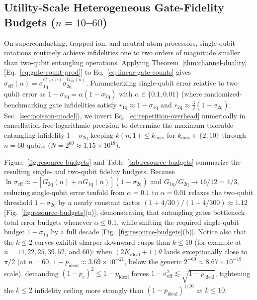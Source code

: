 \subsection{Utility-Scale Heterogeneous Gate-Fidelity Budgets (\texorpdfstring{$n = 10$--$60$}{n = 10--60})}
\label{sec:resource-budgets}

On superconducting, trapped-ion, and neutral-atom processors, single-qubit rotations routinely achieve infidelities one to two orders of magnitude smaller than two-qubit entangling operations. Applying Theorem~\ref{thm:channel-duality} [Eq.~\eqref{eq:gate-count-prod}] to Eq.~\eqref{eq:linear-gate-counts} gives $\sigma_{\mathrm{eff}}(n) = \sigma_{1\mathrm{q}}^{G_{1\mathrm{q}}(n)}\sigma_{2\mathrm{q}}^{G_{2\mathrm{q}}(n)}$. Parameterizing single-qubit error relative to two-qubit error as $1 - \sigma_{1\mathrm{q}} = \alpha(1 - \sigma_{2\mathrm{q}})$ with $\alpha \in \{0.1, 0.01\}$ (where randomized-benchmarking gate infidelities satisfy $r_{1\mathrm{q}} \approx 1 - \sigma_{1\mathrm{q}}$ and $r_{2\mathrm{q}} \approx \tfrac{3}{2}(1 - \sigma_{2\mathrm{q}})$; Sec.~\ref{sec:poisson-model}), we invert Eq.~\eqref{eq:repetition-overhead} numerically in cancellation-free logarithmic precision to determine the maximum tolerable entangling infidelity $1 - \sigma_{2\mathrm{q}}$ keeping $k(n, 1) \le k_{\mathrm{max}}$ for $k_{\mathrm{max}} \in \{2, 10\}$ through $n = 60$ qubits ($N = 2^{60} \approx 1.15 \times 10^{18}$).

Figure~\ref{fig:resource-budgets} and Table~\ref{tab:resource-budgets} summarize the resulting single- and two-qubit fidelity budgets. Because $\ln\sigma_{\mathrm{eff}} \approx -[G_{2\mathrm{q}}(n) + \alpha G_{1\mathrm{q}}(n)](1 - \sigma_{2\mathrm{q}})$ and $G_{1\mathrm{q}}/G_{2\mathrm{q}} \to 16/12 = 4/3$, reducing single-qubit error tenfold from $\alpha = 0.1$ to $\alpha = 0.01$ relaxes the two-qubit threshold $1 - \sigma_{2\mathrm{q}}$ by a nearly constant factor $(1 + 4/30)/(1 + 4/300) \approx 1.12$ [Fig.~\ref{fig:resource-budgets}(a)], demonstrating that entangling gates bottleneck total error budgets whenever $\alpha \le 0.1$, while shifting the required single-qubit budget $1 - \sigma_{1\mathrm{q}}$ by a full decade [Fig.~\ref{fig:resource-budgets}(b)]. Notice also that the $k \le 2$ curves exhibit sharper downward cusps than $k \le 10$ (for example at $n = 14, 22, 25, 39, 52$, and $60$): when $(2K_{\mathrm{ideal}} + 1)\theta$ lands exceptionally close to $\pi/2$ (at $n = 60$, $1 - p_{\mathrm{ideal}} \approx 3.69 \times 10^{-21}$, below the generic $2^{-60} \approx 8.67 \times 10^{-19}$ scale), demanding $(1 - p_e)^2 \le 1 - p_{\mathrm{ideal}}$ forces $1 - \sigma_{\mathrm{eff}}^2 \lesssim \sqrt{1 - p_{\mathrm{ideal}}}$, tightening the $k \le 2$ infidelity ceiling more strongly than $(1 - p_{\mathrm{ideal}})^{1/10}$ at $k \le 10$.

